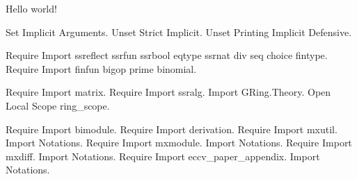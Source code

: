 \documentclass{article}
\begin{document}
Hello world!

\begin{coq_eval}
Set Implicit Arguments.
Unset Strict Implicit.
Unset Printing Implicit Defensive. 

Require Import ssreflect ssrfun ssrbool eqtype ssrnat div seq choice fintype.
Require Import finfun bigop prime binomial.

Require Import matrix.
Require Import ssralg.
Import GRing.Theory.
Open Local Scope ring_scope.

Require Import bimodule.
Require Import derivation.
Require Import mxutil.
Import Notations.
Require Import mxmodule.
Import Notations.
Require Import mxdiff.
Import Notations.
Require Import eccv_paper_appendix.
Import Notations.

\end{coq_eval}
\end{document}
